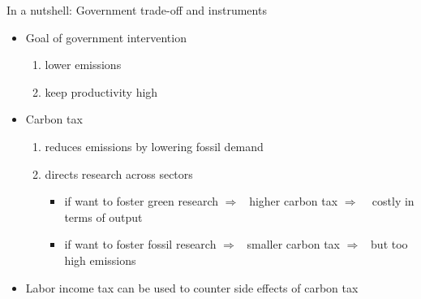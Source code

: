 \documentclass[11pt,aspectratio=169]{beamer}
\newcommand{\ar}{$\Rightarrow$ \ }
\begin{document}

\begin{frame}{In a nutshell: Government trade-off and instruments}
\pause
	\begin{itemize}[<+-| alert@+>]
		\item 	Goal of government intervention
		\begin{enumerate}
			\item[a)] lower emissions
			\item[b)] keep productivity high
		\end{enumerate}
	\vspace{3mm}
	\item Carbon tax
	\begin{enumerate}
		\item[a)] reduces emissions by lowering fossil demand
		\item[b)] directs research across sectors
		\begin{itemize}
			\item[-] if want to foster green research
			\ar higher carbon tax \ar %
			 costly in terms of output %
			\item[-] if want to foster fossil research \ar smaller carbon tax \ar but too high emissions
		\end{itemize}
	\end{enumerate}
\item Labor income tax can be used to counter side effects of carbon tax 
	\end{itemize}
\end{frame}
\end{document}
